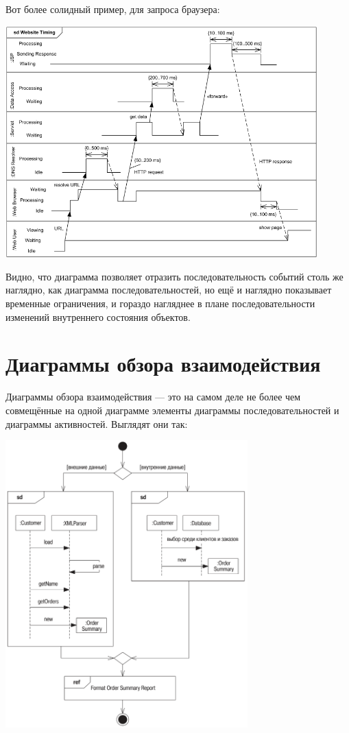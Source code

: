 \documentclass{../mcstext}
\begin{document}
Вот более солидный пример, для запроса браузера:

\begin{center}
    \includegraphics[width=0.9\textwidth]{timingDiagramExample.png}
\end{center}

Видно, что диаграмма позволяет отразить последовательность событий столь же наглядно, как диаграмма последовательностей, но ещё и наглядно показывает временные ограничения, и гораздо нагляднее в плане последовательности изменений внутреннего состояния объектов.

\section{Диаграммы обзора взаимодействия}

Диаграммы обзора взаимодействия --- это на самом деле не более чем совмещённые на одной диаграмме элементы диаграммы последовательностей и диаграммы активностей. Выглядят они так:

\begin{center}
    \includegraphics[width=0.7\textwidth]{interactionOverviewDiagrams.png}
\end{center}
\end{document}
